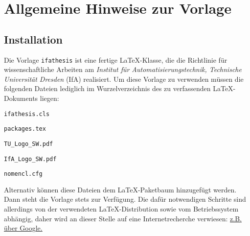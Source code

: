 
\chapter{Allgemeine Hinweise zur Vorlage}
\label{sec:AllgemeineHinweiseZurVorlage}

\section{Installation}
\label{sec:install}

Die Vorlage \verb-ifathesis- ist eine fertige \LaTeX-Klasse, die die Richtlinie für wissenschaftliche Arbeiten am \emph{Institut für Automatisierungstechnik, Technische Universität Dresden} (IfA) realisiert. Um diese Vorlage zu verwenden müssen die folgenden Dateien lediglich im Wurzelverzeichnis des zu verfassenden \LaTeX-Dokuments liegen:
\begin{compactitem}
  \item \verb-ifathesis.cls-
  \item \verb-packages.tex-
  \item \verb-TU_Logo_SW.pdf-
  \item \verb-IfA_Logo_SW.pdf-
  \item \verb-nomencl.cfg-
\end{compactitem}
Alternativ können diese Dateien dem \LaTeX-Paketbaum hinzugefügt werden. Dann steht die Vorlage stets zur Verfügung. Die dafür notwendigen Schritte sind allerdings von der verwendeten \LaTeX-Distribution sowie vom Betriebssystem abhängig, daher wird an dieser Stelle auf eine Internetrecherche verwiesen: \href{http://www.google.de/search?sourceid=chrome&ie=UTF-8&q=latex+install+packages}{z.B. über Google.}

